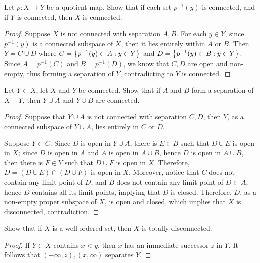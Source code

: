 \documentclass[12pt,a4paper]{article}
\begin{document}
    \begin{ex}
        Let $p:X\to Y$ be a quotient map. Show that if each set $p^{-1}({y})$ is connected, and if $Y$ is connected, then $X$ is connected.
    \end{ex}
    \begin{proof}
        Suppose $X$ is not connected with separation $A,B$. For each $y\in Y$, since $p^{-1}({y})$ is a connected subspace of $X$, then it lies entirely within $A$ or $B$. Then $Y=C\cup D$ where $C=\left\{p^{-1}({y})\subset A: y\in Y\right\}$ and $D=\left\{p^{-1}({y})\subset B: y\in Y\right\}$. Since $A=p^{-1}(C)$ and $B=p^{-1}(D)$, we know that $C,D$ are open and non-empty, thus forming a separation of $Y$, contradicting to $Y$ is connected.
    \end{proof}
    \hfill

    \begin{ex}
        Let $Y\subset X$, let $X$ and $Y$ be connected. Show that if $A$ and $B$ form a separation of $X-Y$, then $Y\cup A$ and $Y\cup B$ are connected.
    \end{ex}
    \begin{proof}
        Suppose that $Y\cup A$ is not connected with separation $C,D$, then $Y$, as a connected subspace of $Y\cup A$, lies entirely in $C$ or $D$.
        
        Suppose $Y\subset C$. Since $D$ is open in $Y\cup A$, there is $E\in B$ such that $D\cup E$ is open in $X$; since $D$ is open in $A$ and $A$ is open in $A\cup B$, hence $D$ is open in $A\cup B$, then there is $F\in Y$ such that $D\cup F$ is open in $X$. Therefore, $D=(D\cup E)\cap(D\cup F)$ is open in $X$. Moreover, notice that $C$ does not contain any limit point of $D$, and $B$ does not contain any limit point of $D\subset A$, hence $D$ contains all its limit points, implying that $D$ is closed. Therefore, $D$, as a non-empty proper subspace of $X$, is open and closed, which implies that $X$ is disconnected, contradiction.
    \end{proof}
    \hfill

    \begin{ex}
        Show that if $X$ is a well-ordered set, then $X$ is totally disconnected. 
    \end{ex}
    \begin{proof}
        If $Y\subset X$ contains $x<y$, then $x$ has an immediate successor $z$ in $Y$. It follows that $(-\infty,z),(x,\infty)$ separates $Y$.
    \end{proof}
\end{document}
